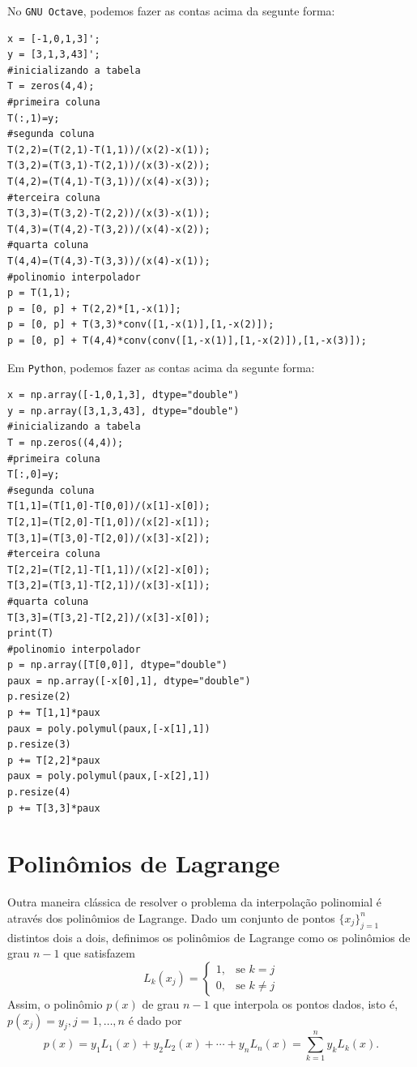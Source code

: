 \begin{sol}
\ifisoctave
No \verb+GNU Octave+, podemos fazer as contas acima da segunte forma:
\begin{verbatim}
x = [-1,0,1,3]';
y = [3,1,3,43]';
#inicializando a tabela
T = zeros(4,4);
#primeira coluna
T(:,1)=y;
#segunda coluna
T(2,2)=(T(2,1)-T(1,1))/(x(2)-x(1));
T(3,2)=(T(3,1)-T(2,1))/(x(3)-x(2));
T(4,2)=(T(4,1)-T(3,1))/(x(4)-x(3));
#terceira coluna
T(3,3)=(T(3,2)-T(2,2))/(x(3)-x(1));
T(4,3)=(T(4,2)-T(3,2))/(x(4)-x(2));
#quarta coluna
T(4,4)=(T(4,3)-T(3,3))/(x(4)-x(1));
#polinomio interpolador
p = T(1,1);
p = [0, p] + T(2,2)*[1,-x(1)];
p = [0, p] + T(3,3)*conv([1,-x(1)],[1,-x(2)]);
p = [0, p] + T(4,4)*conv(conv([1,-x(1)],[1,-x(2)]),[1,-x(3)]);
\end{verbatim}
\fi
\ifispython
Em \verb+Python+, podemos fazer as contas acima da segunte forma:
\begin{verbatim}
x = np.array([-1,0,1,3], dtype="double")
y = np.array([3,1,3,43], dtype="double")
#inicializando a tabela
T = np.zeros((4,4));
#primeira coluna
T[:,0]=y;
#segunda coluna
T[1,1]=(T[1,0]-T[0,0])/(x[1]-x[0]);
T[2,1]=(T[2,0]-T[1,0])/(x[2]-x[1]);
T[3,1]=(T[3,0]-T[2,0])/(x[3]-x[2]);
#terceira coluna
T[2,2]=(T[2,1]-T[1,1])/(x[2]-x[0]);
T[3,2]=(T[3,1]-T[2,1])/(x[3]-x[1]);
#quarta coluna
T[3,3]=(T[3,2]-T[2,2])/(x[3]-x[0]);
print(T)
#polinomio interpolador
p = np.array([T[0,0]], dtype="double")
paux = np.array([-x[0],1], dtype="double")
p.resize(2)
p += T[1,1]*paux
paux = poly.polymul(paux,[-x[1],1])
p.resize(3)
p += T[2,2]*paux
paux = poly.polymul(paux,[-x[2],1])
p.resize(4)
p += T[3,3]*paux
\end{verbatim}
\fi
\end{sol}

\section{Polinômios de Lagrange}
Outra maneira clássica de resolver o problema da interpolação polinomial é através dos polinômios de Lagrange. Dado um conjunto de pontos $\{x_j\}_{j=1}^n$ distintos dois a dois, definimos os polinômios de Lagrange como os polinômios de grau $n-1$ que satisfazem
\begin{equation*}
L_k(x_j)=\left\{\begin{array}{rl}
1,& \text{se }k=j\\
0,& \text{se }k\neq j
\end{array}
\right.
\end{equation*}
Assim, o polinômio $p(x)$ de grau $n-1$ que interpola os pontos dados, isto é, $p(x_j)=y_j, j=1,\ldots,n$ é dado por
\begin{equation*}
  p(x)=y_1L_1(x)+y_2L_2(x)+\cdots +y_nL_n(x)=\sum_{k=1}^n y_k L_k(x).
\end{equation*}

